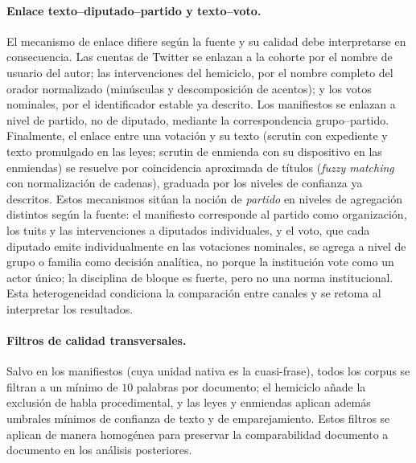 \paragraph{Enlace texto--diputado--partido y texto--voto.}
El mecanismo de enlace difiere según la fuente y su calidad debe interpretarse en
consecuencia. Las cuentas de Twitter se enlazan a la cohorte por el nombre de
usuario del autor; las intervenciones del hemiciclo, por el nombre completo del
orador normalizado (minúsculas y descomposición de acentos); y los votos
nominales, por el identificador estable ya descrito. Los manifiestos se enlazan a
nivel de partido, no de diputado, mediante la correspondencia grupo--partido.
Finalmente, el enlace entre una votación y su texto (scrutin con expediente y
texto promulgado en las leyes; scrutin de enmienda con su dispositivo en las
enmiendas) se resuelve por coincidencia aproximada de títulos (\emph{fuzzy
matching} con normalización de cadenas), graduada por los niveles de confianza ya
descritos. Estos mecanismos sitúan la noción de \emph{partido} en niveles de
agregación distintos según la fuente: el manifiesto corresponde al partido como
organización, los tuits y las intervenciones a diputados individuales, y el voto,
que cada diputado emite individualmente en las votaciones nominales, se agrega a
nivel de grupo o familia como decisión analítica, no porque la institución vote
como un actor único; la disciplina de bloque es fuerte, pero no una norma
institucional. Esta heterogeneidad condiciona la comparación entre canales y se
retoma al interpretar los resultados.

\paragraph{Filtros de calidad transversales.}
Salvo en los manifiestos (cuya unidad nativa es la cuasi-frase), todos los
corpus se filtran a un mínimo de $10$ palabras por documento; el hemiciclo añade
la exclusión de habla procedimental, y las leyes y enmiendas aplican además
umbrales mínimos de confianza de texto y de emparejamiento. Estos filtros se
aplican de manera homogénea para preservar la comparabilidad documento a
documento en los análisis posteriores.

